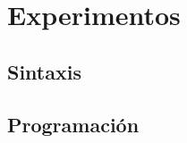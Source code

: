 \documentclass[12pt, runningheads,a4]{book}
\begin{document}
\section{Experimentos}
\subsection{Sintaxis}

	

	





\subsection{Programación}

\end{document}
